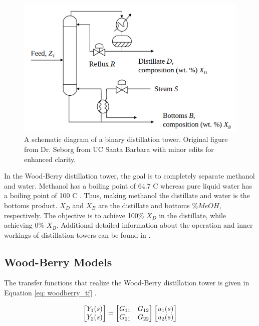 \begin{figure}[h]
    \centering
    \includegraphics[scale=0.45]{images/woodberry.png}
    \caption{A schematic diagram of a binary distillation tower.  Original figure from Dr. Seborg from UC Santa Barbara with minor edits for enhanced clarity.}
    \label{fig: woodberry}
\end{figure}

In the Wood-Berry distillation tower, the goal is to completely separate methanol and water.  Methanol has a boiling point of 64.7 \textdegree C whereas pure liquid water has a boiling point of 100 \textdegree C \cite{sonntag_thermo}. Thus, making methanol the distillate and water is the bottoms product. $X_D$ and $X_B$ are the distillate and bottoms $\%MeOH$, respectively. The objective is to achieve 100\% $X_D$ in the distillate, while achieving 0\% $X_B$. Additional detailed information about the operation and inner workings of distillation towers can be found in \cite{henry_distillation}.  

\subsection{Wood-Berry Models}
The transfer functions that realize  the Wood-Berry distillation tower is given in Equation \ref{eq: woodberry_tf} \cite{mpc_for_distillation_tower}.

\begin{equation}
    \centering
    \begin{bmatrix}
        Y_1(s) \\
        Y_2(s) 
    \end{bmatrix}
    =
    \begin{bmatrix}
        G_{11}  & G_{12} \\
        G_{21}  & G_{22}
    \end{bmatrix}
    \begin{bmatrix}
        u_1(s) \\
        u_2(s)
    \end{bmatrix}
    \label{eq: woodberry_tf}
\end{equation}

